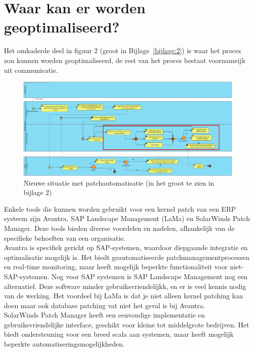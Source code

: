 \documentclass[dutch,dit,thesis]{hogentreport}
\begin{document}
\section{Waar kan er worden geoptimaliseerd?}

Het omkaderde deel in figuur 2 (groot in Bijlage~\ref{bijlage:2}) is waar het proces zou kunnen worden geoptimaliseerd, de rest van het proces bestaat voornameijk uit communicatie.
 \begin{figure}[htbp]
    \centering
    \includegraphics[width=\textwidth]{huidigesituatie2.png}
    \caption{Nieuwe situatie met patchautomatisatie (in het groot te zien in bijlage 2)}
     \label{fig:huidigesituatie2}
\end{figure}



Enkele tools die kunnen worden gebruikt voor een kernel patch van een ERP systeem zijn Avantra, SAP Landscape Management (LaMa) en SolarWinds Patch Manager. Deze tools bieden diverse voordelen en nadelen, afhankelijk van de specifieke behoeften van een organisatie. \\
 Avantra is specifiek gericht op SAP-systemen, waardoor diepgaande integratie en optimalisatie mogelijk is. Het biedt geautomatiseerde patchmanagementprocessen en real-time monitoring, maar heeft 
 mogelijk beperkte functionaliteit voor niet-SAP-systemen. Nog voor SAP systemen is SAP Landscape Management nog een alternatief. Deze software minder gebruiksvriendelijkk, en er is veel kennis nodig van de werking. Het voordeel 
 bij LaMa is dat je niet alleen kernel patching kan doen maar ook database patching vat niet het geval is bij Avantra. \\
 SolarWinds Patch Manager heeft een eenvoudige implementatie en gebruiksvriendelijke interface, geschikt voor kleine tot middelgrote bedrijven. Het biedt ondersteuning voor een breed scala aan 
 systemen, maar heeft mogelijk beperkte automatiseringsmogelijkheden. \\
\end{document}
